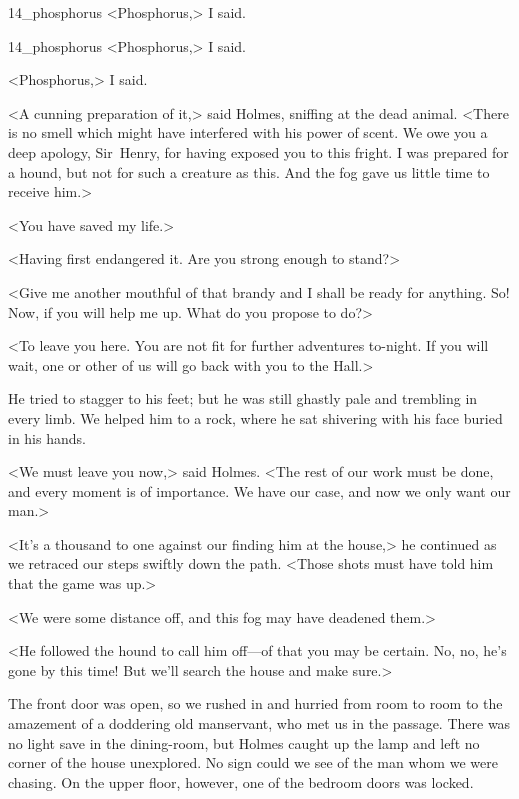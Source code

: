 \begin{letter}
	\begin{bwbigpic}
			[1.0]  
		{14_phosphorus}
		{<Phosphorus,> I said.}
	\end{bwbigpic}
\end{letter}
\begin{a4}
	\begin{bwbigpic}
		[1.0] 
		{14_phosphorus}
		{<Phosphorus,> I said.}
	\end{bwbigpic}
\end{a4}



<Phosphorus,> I said.

<A cunning preparation of it,> said Holmes, sniffing at the dead animal. <There is no smell which might have interfered with his power of scent. We owe you a deep apology, Sir~Henry, for having exposed you to this fright. I was prepared for a hound, but not for such a creature as this. And the fog gave us little time to receive him.>

<You have saved my life.>

<Having first endangered it. Are you strong enough to stand?>

<Give me another mouthful of that brandy and I shall be ready for anything. So! Now, if you will help me up. What do you propose to do?>



<To leave you here. You are not fit for further adventures to-night. If you will wait, one or other of us will go back with you to the Hall.>

He tried to stagger to his feet; but he was still ghastly pale and trembling in every limb. We helped him to a rock, where he sat shivering with his face buried in his hands.

<We must leave you now,> said Holmes. <The rest of our work must be done, and every moment is of importance. We have our case, and now we only want our man.>

<It's a thousand to one against our finding him at the house,> he continued as we retraced our steps swiftly down the path. <Those shots must have told him that the game was up.>

<We were some distance off, and this fog may have deadened them.>

<He followed the hound to call him off—of that you may be certain. No, no, he's gone by this time! But we'll search the house and make sure.>

The front door was open, so we rushed in and hurried from room to room to the amazement of a doddering old manservant, who met us in the passage. There was no light save in the dining-room, but Holmes caught up the lamp and left no corner of the house unexplored. No sign could we see of the man whom we were chasing. On the upper floor, however, one of the bedroom doors was locked.

